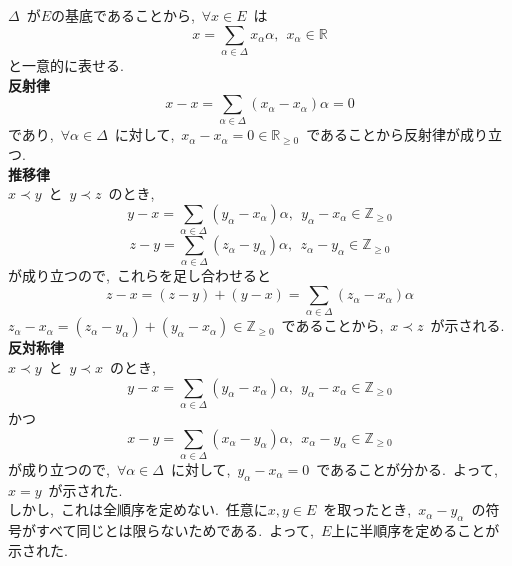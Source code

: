 \documentclass[uplatex,dvipdfmx]{jsarticle}
\begin{document}
\begin{myproof}
    $\Delta$~が$E$の基底であることから,~$\forall x \in E$~は
    \begin{equation*}
        x = \sum_{\alpha \in \Delta} x_\alpha \alpha,~~x_\alpha \in \mathbb{R}
    \end{equation*}
    と一意的に表せる.~\\
    \textbf{反射律}\\
    \begin{equation*}
        x - x = \sum_{\alpha \in \Delta} (x_\alpha - x_\alpha) \alpha = 0
    \end{equation*}
    であり,~$\forall \alpha \in \Delta$~に対して,~$x_\alpha - x_\alpha = 0 \in \mathbb{R}_{\geq 0}$~であることから反射律が成り立つ.\\
    \textbf{推移律}\\
    $x \prec y$~と~$y \prec z$~のとき,~
    \begin{equation*}
        y - x = \sum_{\alpha \in \Delta} (y_\alpha - x_\alpha) \alpha,~~y_\alpha - x_\alpha \in \mathbb{Z}_{\geq 0}
    \end{equation*}
    \begin{equation*}
        z - y = \sum_{\alpha \in \Delta} (z_\alpha - y_\alpha) \alpha,~~z_\alpha - y_\alpha \in \mathbb{Z}_{\geq 0}
    \end{equation*}
    が成り立つので,~これらを足し合わせると
    \begin{equation*}
        z - x = (z - y) + (y - x) = \sum_{\alpha \in \Delta} (z_\alpha - x_\alpha) \alpha
    \end{equation*}
    $z_\alpha - x_\alpha = (z_\alpha - y_\alpha) + (y_\alpha - x_\alpha) \in \mathbb{Z}_{\geq 0}$~であることから,~$x \prec z$~が示される.\\
    \textbf{反対称律}\\
    $x \prec y$~と~$y \prec x$~のとき,~
    \begin{equation*}
        y - x = \sum_{\alpha \in \Delta} (y_\alpha - x_\alpha) \alpha,~~y_\alpha - x_\alpha \in \mathbb{Z}_{\geq 0}
    \end{equation*}
    かつ
    \begin{equation*}
        x - y = \sum_{\alpha \in \Delta} (x_\alpha - y_\alpha) \alpha,~~x_\alpha - y_\alpha \in \mathbb{Z}_{\geq 0}
    \end{equation*}
    が成り立つので,~$\forall \alpha \in \Delta$~に対して,~$y_\alpha - x_\alpha = 0$~であることが分かる.~よって,~$x = y$~が示された.\\
    しかし,~これは全順序を定めない.~任意に$x,y \in E$~を取ったとき,~$x_\alpha - y_\alpha$~の符号がすべて同じとは限らないためである.~よって,~$E$上に半順序を定めることが示された.
\end{myproof}
\end{document}
